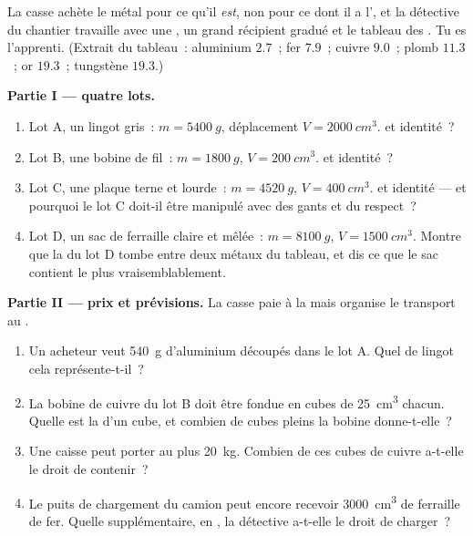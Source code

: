 \begin{problem}\label{pb:g7:volume-mass-density:1}
La casse achète le métal pour ce qu'il \emph{est}, non pour ce dont
il a l', et la détective du chantier travaille avec une ,
un grand récipient gradué et le tableau des . Tu es
l'apprenti. (Extrait du tableau~: aluminium $2.7$~; fer $7.9$~;
cuivre $9.0$~; plomb $11.3$~; or $19.3$~; tungstène $19.3$.)

\medskip\noindent\textbf{Partie I --- quatre lots.}
\begin{enumerate}
  \item Lot A, un lingot gris~: $m = \qty{5400}{g}$, déplacement
        $V = \qty{2000}{cm^3}$.  et identité~?
  \item Lot B, une bobine de fil~: $m = \qty{1800}{g}$,
        $V = \qty{200}{cm^3}$.  et identité~?
  \item Lot C, une plaque terne et lourde~: $m = \qty{4520}{g}$,
        $V = \qty{400}{cm^3}$.  et identité --- et
        pourquoi le lot C doit-il être manipulé avec des gants et
        du respect~?
  \item Lot D, un sac de ferraille claire et mêlée~:
        $m = \qty{8100}{g}$, $V = \qty{1500}{cm^3}$. Montre que la
         du lot D tombe entre deux métaux du
        tableau, et dis ce que le sac contient le plus
        vraisemblablement.
\end{enumerate}

\medskip\noindent\textbf{Partie II --- prix et prévisions.}
La casse paie à la  mais organise le transport au .
\begin{enumerate}[resume]
  \item Un acheteur veut \qty{540}{g} d'aluminium découpés dans le
        lot A. Quel  de lingot cela représente-t-il~?
  \item La bobine de cuivre du lot B doit être fondue en cubes de
        \qty{25}{cm^3} chacun. Quelle est la  d'un cube, et
        combien de cubes pleins la bobine donne-t-elle~?
  \item Une caisse peut porter au plus \qty{20}{kg}. Combien de ces
        cubes de cuivre a-t-elle le droit de contenir~?
  \item Le puits de chargement du camion peut encore recevoir
        \qty{3000}{cm^3} de ferraille de fer. Quelle 
        supplémentaire, en , la détective a-t-elle le
        droit de charger~?
\end{enumerate}


\end{problem}
